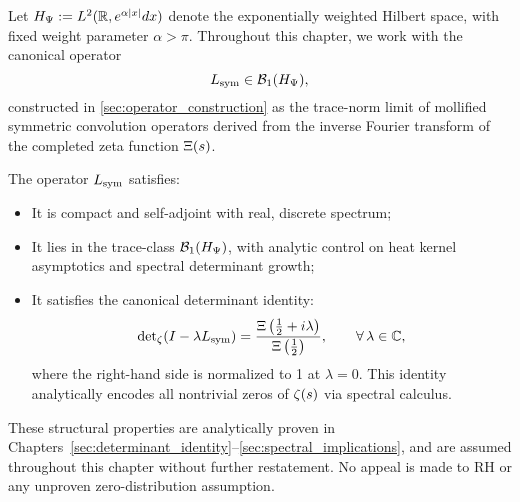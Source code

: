 \begin{remark}
\label{rem:setup_operator_framework}

Let \( H_{\Psi} := L^2(\mathbb{R}, e^{\alpha|x|} dx) \) denote the exponentially weighted Hilbert space, with fixed weight parameter \( \alpha > \pi \). Throughout this chapter, we work with the canonical operator
\[
L_{\mathrm{sym}} \in \mathcal{B}_1(H_{\Psi}),
\]
constructed in \cref{sec:operator_construction} as the trace-norm limit of mollified symmetric convolution operators derived from the inverse Fourier transform of the completed zeta function \( \Xi(s) \).

The operator \( L_{\mathrm{sym}} \) satisfies:
\begin{itemize}
  \item It is compact and self-adjoint with real, discrete spectrum;
  \item It lies in the trace-class \( \mathcal{B}_1(H_{\Psi}) \), with analytic control on heat kernel asymptotics and spectral determinant growth;
  \item It satisfies the canonical determinant identity:
  \[
  \det\nolimits_\zeta(I - \lambda L_{\mathrm{sym}}) = \frac{\Xi\left( \tfrac{1}{2} + i\lambda \right)}{\Xi\left( \tfrac{1}{2} \right)},
  \qquad \forall\, \lambda \in \mathbb{C},
  \]
  where the right-hand side is normalized to 1 at \( \lambda = 0 \). This identity analytically encodes all nontrivial zeros of \( \zeta(s) \) via spectral calculus.
\end{itemize}

\medskip

\noindent
These structural properties are analytically proven in Chapters~\ref{sec:determinant_identity}–\ref{sec:spectral_implications}, and are assumed throughout this chapter without further restatement. No appeal is made to RH or any unproven zero-distribution assumption.
\end{remark}
